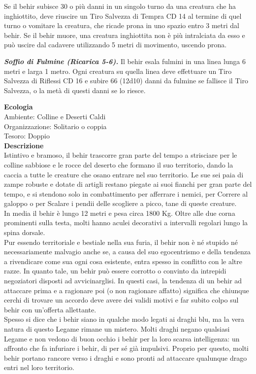 \begin{multicols}{2}
Se il behir subisce 30 o più danni in un singolo turno da una creatura che ha inghiottito, deve riuscire un Tiro Salvezza di Tempra CD 14 al termine di quel turno o vomitare la creatura, che ricade prona in uno spazio entro 3 metri dal behir. Se il behir muore, una creatura inghiottita non è più intralciata da esso e può uscire dal cadavere utilizzando 5 metri di movimento, uscendo prona.

\emph{\textbf{Soffio di Fulmine (Ricarica 5-6).}} Il behir esala fulmini in una linea lunga 6 metri e larga 1 metro. Ogni creatura su quella linea deve effettuare un Tiro Salvezza di Riflessi CD 16 e subire 66 (12d10) danni da fulmine se fallisce il Tiro Salvezza, o la metà di questi danni se lo riesce.

\textbf{Ecologia}\\
Ambiente: Colline e Deserti Caldi\\
Organizzazione: Solitario o coppia\\
Tesoro: Doppio\\
\textbf{Descrizione}\\
Istintivo e bramoso, il behir trascorre gran parte del tempo a strisciare per le colline sabbiose e le rocce del deserto che formano il suo territorio, dando la caccia a tutte le creature che osano entrare nel suo territorio. Le sue sei paia di zampe robuste e dotate di artigli restano piegate ai suoi fianchi per gran parte del tempo, e si stendono solo in combattimento per afferrare i nemici, per Correre al galoppo o per Scalare i pendii delle scogliere a picco, tane di queste creature.\\
In media il behir è lungo 12 metri e pesa circa 1800 Kg. Oltre alle due corna prominenti sulla testa, molti hanno aculei decorativi a intervalli regolari lungo la spina dorsale.\\
Pur essendo territoriale e bestiale nella sua furia, il behir non è né stupido né necessariamente malvagio anche se, a causa del suo egocentrismo e della tendenza a rivendicare come sua ogni cosa esistente, entra spesso in conflitto con le altre razze. In quanto tale, un behir può essere corrotto o convinto da intrepidi negoziatori disposti ad avvicinarglisi. In questi casi, la tendenza di un behir ad attaccare prima e a ragionare poi (o non ragionare affatto) significa che chiunque cerchi di trovare un accordo deve avere dei validi motivi e far subito colpo sul behir con un'offerta allettante.\\
Spesso si dice che i behir siano in qualche modo legati ai draghi blu, ma la vera natura di questo Legame rimane un mistero. Molti draghi negano qualsiasi Legame e non vedono di buon occhio i behir per la loro scarsa intelligenza: un affronto che fa infuriare i behir, di per sé già impulsivi. Proprio per questo, molti behir portano rancore verso i draghi e sono pronti ad attaccare qualunque drago entri nel loro territorio.\\



\end{multicols}
